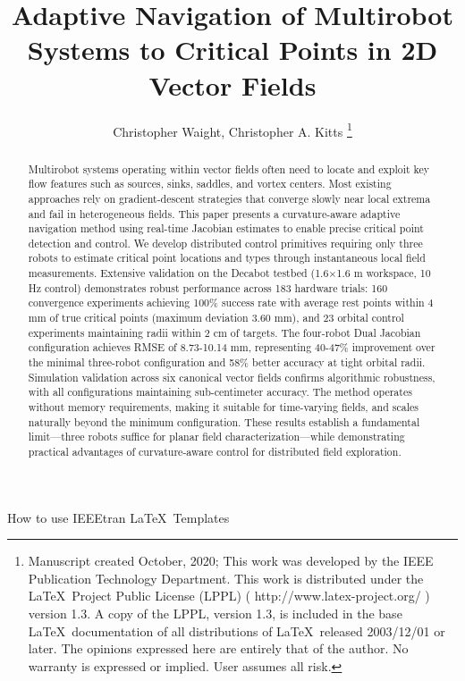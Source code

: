 \documentclass[lettersize,journal]{IEEEtran}
\begin{document}
\title{Adaptive Navigation of Multirobot Systems to Critical Points in 2D Vector Fields}
\author{Christopher Waight, Christopher A. Kitts
\thanks{Manuscript created October, 2020; This work was developed by the IEEE Publication Technology Department. This work is distributed under the \LaTeX \ Project Public License (LPPL) ( http://www.latex-project.org/ ) version 1.3. A copy of the LPPL, version 1.3, is included in the base \LaTeX \ documentation of all distributions of \LaTeX \ released 2003/12/01 or later. The opinions expressed here are entirely that of the author. No warranty is expressed or implied. User assumes all risk.}}

%
{How to use IEEEtran \LaTeX \ Templates}

\maketitle

\begin{abstract}
Multirobot systems operating within vector fields often need to locate and exploit key flow features such as sources, sinks, saddles, and vortex centers. Most existing approaches rely on gradient-descent strategies that converge slowly near local extrema and fail in heterogeneous fields. This paper presents a curvature-aware adaptive navigation method using real-time Jacobian estimates to enable precise critical point detection and control. We develop distributed control primitives requiring only three robots to estimate critical point locations and types through instantaneous local field measurements. Extensive validation on the Decabot testbed (1.6$\times$1.6 m workspace, 10 Hz control) demonstrates robust performance across 183 hardware trials: 160 convergence experiments achieving 100\% success rate with average rest points within 4 mm of true critical points (maximum deviation 3.60 mm), and 23 orbital control experiments maintaining radii within 2 cm of targets. The four-robot Dual Jacobian configuration achieves RMSE of 8.73-10.14 mm, representing 40-47\% improvement over the minimal three-robot configuration and 58\% better accuracy at tight orbital radii. Simulation validation across six canonical vector fields confirms algorithmic robustness, with all configurations maintaining sub-centimeter accuracy. The method operates without memory requirements, making it suitable for time-varying fields, and scales naturally beyond the minimum configuration. These results establish a fundamental limit—three robots suffice for planar field characterization—while demonstrating practical advantages of curvature-aware control for distributed field exploration.
\end{abstract}
\end{document}
